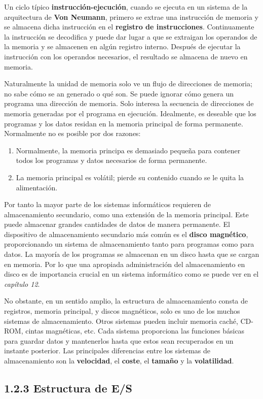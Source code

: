 \documentclass{article}
\begin{document}
Un ciclo t\'{i}pico \textbf{instrucci\'{o}n-ejecuci\'{o}n}, cuando se ejecuta en un sistema de
la arquitectura de \textbf{Von Neumann}, primero se extrae una instrucci\'{o}n de memoria y
se almacena dicha instrucci\'{o}n en el \textbf{registro de instrucciones}. Continuamente la
instrucci\'{o}n se decodifica y puede dar lugar a que se extraigan los operandos de la memoria
y se almacenen en alg\'{u}n registro interno. Despu\'{e}s de ejecutar la instrucci\'{o}n con
los operandos necesarios, el resultado se almacena de nuevo en memoria.

Naturalmente la unidad de memoria solo ve un flujo de direcciones de memoria; no sabe c\'{o}mo
se an generado o qu\'{e} son. Se puede ignorar c\'{o}mo genera un programa una direcci\'{o}n de
memoria. Solo interesa la secuencia de direcciones de memoria generadas por el programa en ejecuci\'{o}n.
Idealmente, es deseable que los programas y los datos residan en la memoria principal de
forma permanente. Normalmente no es posible por dos razones:

\begin{enumerate}
    \item Normalmente, la memoria principa es demasiado peque\~{n}a para contener todos los
    programas y datos necesarios de forma permanente.
    \item La memoria principal es vol\'{a}til; pierde su contenido cuando se le quita la alimentaci\'{o}n.
\end{enumerate}

Por tanto la mayor parte de los sistemas inform\'{a}ticos requieren de almacenamiento secundario,
como una extensi\'{o}n de la memoria principal. Este puede almacenar grandes cantidades de datos
de manera permanente.
El dispositivo de almacenamiento secundario m\'{a}s com\'{u}n es el \textbf{disco magn\'{e}tico},
proporcionando un sistema de almacenamiento tanto para programas como para datos. La mayor\'{i}a
de los programas se almacenan en un disco hasta que se cargan en memoria. Por lo que una apropiada
administraci\'{o}n del almacenamiento en disco es de importancia crucial en un sistema inform\'{a}tico
como se puede ver en el \textit{cap\'{i}tulo 12}.

No obstante, en un sentido amplio, la estructura de almacenamiento consta de registros, memoria principal,
y discos magn\'{e}ticos, solo es uno de los muchos sistemas de almacenamiento. Otros sistemas pueden
incluir memoria cach\'{e}, CD-ROM, cintas magn\'{e}ticas, etc. Cada sistema proporciona las funciones
b\'{a}sicas para guardar datos y mantenerlos hasta que estos sean recuperados en un instante posterior.
Las principales diferencias entre los sistemas de almacenamiento son la \textbf{velocidad}, el
\textbf{coste}, el \textbf{tama\~{n}o} y la \textbf{volatilidad}.

\subsection*{1.2.3 Estructura de E/S}
\end{document}
